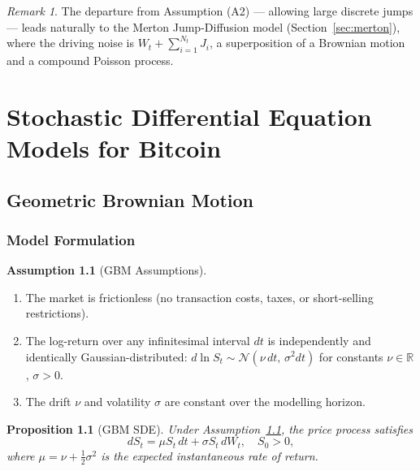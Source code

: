 \documentclass[12pt, a4paper, oneside]{report}
\theoremstyle{plain}
\newtheorem{proposition}[theorem]{Proposition}
\theoremstyle{definition}
\newtheorem{assumption}[theorem]{Assumption}
\theoremstyle{remark}
\newtheorem{remark}[theorem]{Remark}
\newcommand{\R}{\mathbb{R}}
\begin{document}
\begin{remark}
The departure from Assumption (A2) --- allowing large discrete jumps --- leads naturally
to the Merton Jump-Diffusion model (Section~\ref{sec:merton}), where the driving noise
is $W_t + \sum_{i=1}^{N_t} J_i$, a superposition of a Brownian motion and a
compound Poisson process.
\end{remark}

\chapter{Stochastic Differential Equation Models for Bitcoin}
\label{ch:sde_models}

\section{Geometric Brownian Motion}
\label{sec:gbm}

\subsection{Model Formulation}

\begin{assumption}[GBM Assumptions]
\label{ass:gbm}
\begin{enumerate}[leftmargin=1.25cm, label=\textup{(G\arabic*)}]
  \item The market is frictionless (no transaction costs, taxes, or short-selling
    restrictions).
  \item The log-return over any infinitesimal interval $dt$ is independently and
    identically Gaussian-distributed:
    $d\ln S_t \sim \mathcal{N}(\nu\,dt,\, \sigma^2 dt)$ for constants
    $\nu \in \R$, $\sigma > 0$.
  \item The drift $\nu$ and volatility $\sigma$ are constant over the modelling
    horizon.
\end{enumerate}
\end{assumption}

\begin{proposition}[GBM SDE]
\label{prop:gbm_sde}
Under Assumption~\ref{ass:gbm}, the price process satisfies
\begin{equation}
\label{eq:gbm}
  dS_t = \mu S_t\,dt + \sigma S_t\,dW_t, \quad S_0 > 0,
\end{equation}
where $\mu = \nu + \frac{1}{2}\sigma^2$ is the expected instantaneous rate of return.
\end{proposition}
\end{document}

